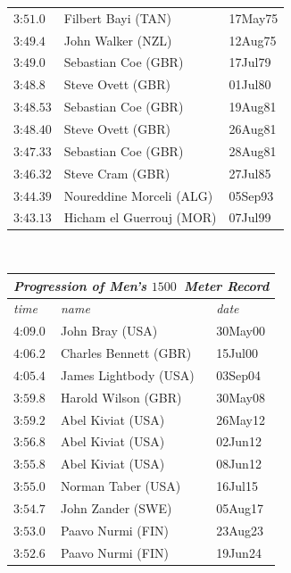 \begin{figure}
{{\begin{tabular}[t]{|l|ll|}
           $\text{3:51}.0$      &Filbert Bayi (TAN)         &17May75 \\
           $\text{3:49}.4$      &John Walker (NZL)          &12Aug75 \\
           $\text{3:49}.0$      &Sebastian Coe (GBR)        &17Jul79 \\
           $\text{3:48}.8$      &Steve Ovett (GBR)          &01Jul80 \\
           $\text{3:48}.53$     &Sebastian Coe (GBR)        &19Aug81 \\
           $\text{3:48}.40$     &Steve Ovett (GBR)          &26Aug81 \\
           $\text{3:47}.33$     &Sebastian Coe (GBR)        &28Aug81 \\
           $\text{3:46}.32$     &Steve Cram (GBR)           &27Jul85 \\
           $\text{3:44}.39$     &Noureddine Morceli (ALG)   &05Sep93 \\
	   $\text{3:43}.13$     &Hicham el Guerrouj (MOR)   &07Jul99 \\
      \hline
      \end{tabular}
      \   %
        \begin{tabular}[t]{|l|ll|}
        \hline
          \multicolumn{3}{|c|}{\textit{Progression of Men's $1500$~Meter Record}}  \\
        \hline
        \textit{time}  &\textit{name}  &\textit{date}  \\
         \hline
         $\text{4:09}.0$   &John Bray (USA)        &30May00  \\
         $\text{4:06}.2$   &Charles Bennett (GBR)  &15Jul00  \\
         $\text{4:05}.4$   &James Lightbody (USA)  &03Sep04  \\
         $\text{3:59}.8$   &Harold Wilson (GBR)    &30May08  \\
         $\text{3:59}.2$   &Abel Kiviat (USA)      &26May12  \\
         $\text{3:56}.8$   &Abel Kiviat (USA)      &02Jun12  \\
         $\text{3:55}.8$   &Abel Kiviat (USA)      &08Jun12  \\
         $\text{3:55}.0$   &Norman Taber (USA)     &16Jul15  \\
         $\text{3:54}.7$   &John Zander (SWE)      &05Aug17  \\
         $\text{3:53}.0$   &Paavo Nurmi (FIN)      &23Aug23  \\
         $\text{3:52}.6$   &Paavo Nurmi (FIN)      &19Jun24  \\

\end{tabular}}}
\end{figure}
